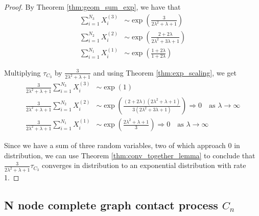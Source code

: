 \documentclass{article}
\theoremstyle{plain}
\theoremstyle{definition}
\theoremstyle{remark}
\numberwithin{equation}{section}
\begin{document}
\begin{proof}
By Theorem \eqref{thm:geom_sum_exp}, we have that
\begin{align*}
    \sum_{i = 1}^{N_3} X_i^{(3)} &\sim \exp\left(
        \frac{3}{2\lambda^2 + \lambda + 1}
        \right) \\
    \sum_{i = 1}^{N_2} X_i^{(2)} &\sim \exp\left(
        \frac{2 + 2\lambda}{2 \lambda^2 + 3\lambda + 1}
    \right)\\
    \sum_{i = 1}^{N_1} X_i^{(1)} &\sim \exp\left(\frac{1 + 2\lambda}{1 + 2\lambda}\right)
\end{align*}

Multiplying $\tau_{C_3}$ by $\frac{3}{2 \lambda^2 + \lambda + 1}$ and using Theorem \eqref{thm:exp_scaling}, we get
\begin{align*}
    \frac{3}{2 \lambda^2 + \lambda + 1} \sum_{i = 1}^{N_3} X_i^{(3)} &\sim \exp\left(
        1
        \right)\\
    \frac{3}{2 \lambda^2 + \lambda + 1} \sum_{i = 1}^{N_2} X_i^{(2)} &\sim \exp\left(
        \frac{(2 + 2\lambda)(2 \lambda^2 + \lambda + 1)}{3 (2 \lambda^2 + 3\lambda + 1)}
    \right)  \Rightarrow 0 \quad \text{as } \lambda \to \infty\\
    \frac{3}{2 \lambda^2 + \lambda + 1} \sum_{i = 1}^{N_1} X_i^{(1)} &\sim \exp\left(
    \frac{2 \lambda^2 + \lambda + 1}{3}
    \right) \Rightarrow 0 \quad \text{as } \lambda \to \infty
\end{align*}

Since we have a sum of three random variables, two of which approach 0 in distribution, we can use Theorem \ref{thm:conv_together_lemma} to conclude that  $\frac{3}{2 \lambda^2 + \lambda + 1} \tau_{C_3}$ converges in distribution to an exponential distribution with rate 1.
\end{proof}

\subsection{N node complete graph contact process \texorpdfstring{$C_n$}{Cn}}

\end{document}
